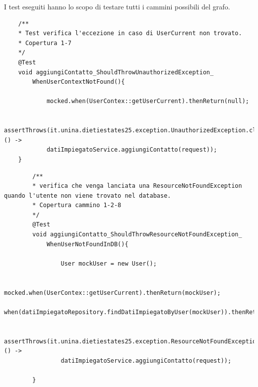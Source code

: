 

I test eseguiti hanno lo scopo di testare tutti i cammini possibili del grafo.

\begin{lstlisting}
	/**
	* Test verifica l'eccezione in caso di UserCurrent non trovato.
	* Copertura 1-7
	*/
	@Test
	void aggiungiContatto_ShouldThrowUnauthorizedException_
		WhenUserContextNotFound(){
		
			mocked.when(UserContex::getUserCurrent).thenReturn(null);
			
			assertThrows(it.unina.dietiestates25.exception.UnauthorizedException.class, () ->
			datiImpiegatoService.aggiungiContatto(request));
	}
\end{lstlisting}

\begin{lstlisting}
		/**
		* verifica che venga lanciata una ResourceNotFoundException quando l'utente non viene trovato nel database.
		* Copertura cammino 1-2-8
		*/
		@Test
		void aggiungiContatto_ShouldThrowResourceNotFoundException_
			WhenUserNotFoundInDB(){
			
				User mockUser = new User();
				
				mocked.when(UserContex::getUserCurrent).thenReturn(mockUser);
				when(datiImpiegatoRepository.findDatiImpiegatoByUser(mockUser)).thenReturn(Optional.empty());
				
				assertThrows(it.unina.dietiestates25.exception.ResourceNotFoundException.class, () ->
				datiImpiegatoService.aggiungiContatto(request));
			
		}
\end{lstlisting}

